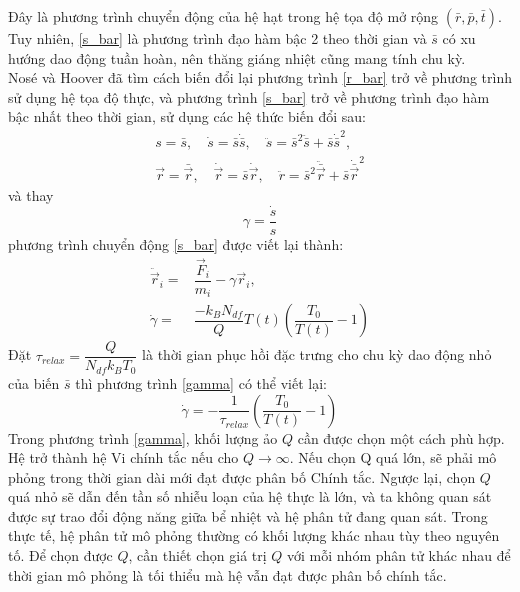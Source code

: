 \documentclass[12pt,a4paper,reqno, oneside]{book}
\begin{document}
			Đây là phương trình chuyển động của hệ hạt trong hệ tọa độ mở rộng $\left( \bar{r},\bar{p},\bar{t} \right)$. Tuy nhiên, \eqref{s_bar} là phương trình đạo hàm bậc 2 theo thời gian và $\bar{s}$ có xu hướng dao động tuần hoàn, nên thăng giáng nhiệt cũng mang tính chu kỳ.\\
			Nosé và Hoover đã tìm cách biến đổi lại phương trình \eqref{r_bar} trở về phương trình sử dụng hệ tọa độ thực, và phương trình \eqref{s_bar} trở về phương trình đạo hàm bậc nhất theo thời gian, sử dụng các hệ thức biến đổi sau:
			\begin{align}
			s = \bar{s},\quad \dot{s} = \bar{s}\dot{\bar{s}},\quad \ddot{s} = \bar{s}^2\ddot{\bar{s}}+\bar{s}\dot{\bar{s}}^2,\\
			\vec{r} = \bar{\vec{r}},\quad \dot{\vec{r}}=\bar{s}\dot{\vec{r}},\quad \ddot{r} = \bar{s}^{2}\ddot{\bar{\vec{r}}} + \bar{s}\dot{\bar{\vec{r}}}^{2}
			\end{align}
			và thay
			\begin{equation}
			\gamma = \dfrac{\dot{s}}{s}
			\end{equation}
			phương trình chuyển động \eqref{s_bar} được viết lại thành:
			\begin{align}
			\ddot{\vec{r}}_{i}= & \dfrac{\vec{F}_{i}}{m_{i}} - \gamma \vec{r}_{i},\\
			\dot{\gamma}= & \dfrac{-k_{B}N_{df}}{Q}T\left(t\right) \left( \dfrac{T_{0}}{T\left(t\right)}-1 \right)
			\label{gamma}
			\end{align}
			Đặt $\tau_{relax} = \dfrac{Q}{N_{df}k_{B}T_{0}}$ là thời gian phục hồi đặc trưng cho chu kỳ dao động nhỏ của biến $\bar{s}$ thì phương trình \eqref{gamma} có thể viết lại:
			\begin{equation}
			\dot{\gamma} = -\dfrac{1}{\tau_{relax}}\left( \dfrac{T_{0}}{T\left(t\right)}-1 \right)
			\end{equation}
			Trong phương trình \eqref{gamma}, khối lượng ảo $Q$ cần được chọn một cách phù hợp. Hệ trở thành hệ Vi chính tắc nếu cho $Q\rightarrow \infty$. Nếu chọn Q quá lớn, sẽ phải mô phỏng trong thời gian dài mới đạt được phân bố Chính tắc. Ngược lại, chọn $Q$ quá nhỏ sẽ dẫn đến tần số nhiễu loạn của hệ thực là lớn, và ta không quan sát được sự trao đổi động năng giữa bể nhiệt và hệ phân tử đang quan sát.
			Trong thực tế, hệ phân tử mô phỏng thường có khối lượng khác nhau tùy theo nguyên tố. Để chọn được $Q$, cần thiết chọn giá trị $Q$ với mỗi nhóm phân tử khác nhau để thời gian mô phỏng là tối thiểu mà hệ vẫn đạt được phân bố chính tắc.
\end{document}
